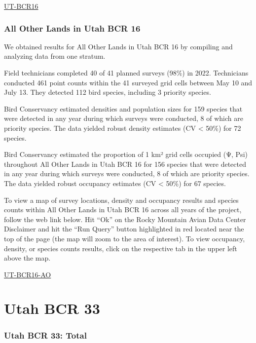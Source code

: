 \documentclass[
  letterpaper,
  DIV=11,
  numbers=noendperiod,
  oneside]{scrreprt}
\begin{document}
\href{http://www.rmbo.org/new_site/adc/QueryWindow.aspx\#N4IgzgrgDgpgTmALnAhoiBbEAuABCAVQBUBaAIQGEAlARgDYQBfIA===}{UT-BCR16}

\hypertarget{all-other-lands-in-utah-bcr-16}{%
\subsubsection{All Other Lands in Utah BCR
16}\label{all-other-lands-in-utah-bcr-16}}

We obtained results for All Other Lands in Utah BCR 16 by compiling and
analyzing data from one stratum.

Field technicians completed 40 of 41 planned surveys (98\%) in 2022.
Technicians conducted 461 point counts within the 41 surveyed grid cells
between May 10 and July 13. They detected 112 bird species, including 3
priority species.

Bird Conservancy estimated densities and population sizes for 159
species that were detected in any year during which surveys were
conducted, 8 of which are priority species. The data yielded robust
density estimates (CV \textless{} 50\%) for 72 species.

Bird Conservancy estimated the proportion of 1 km² grid cells occupied
(Ψ, Psi) throughout All Other Lands in Utah BCR 16 for 156 species that
were detected in any year during which surveys were conducted, 8 of
which are priority species. The data yielded robust occupancy estimates
(CV \textless{} 50\%) for 67 species.

To view a map of survey locations, density and occupancy results and
species counts within All Other Lands in Utah BCR 16 across all years of
the project, follow the web link below. Hit ``Ok'' on the Rocky Mountain
Avian Data Center Disclaimer and hit the ``Run Query'' button
highlighted in red located near the top of the page (the map will zoom
to the area of interest). To view occupancy, density, or species counts
results, click on the respective tab in the upper left above the map.

\href{http://www.rmbo.org/new_site/adc/QueryWindow.aspx\#N4IgzgLgTghhCuBbEAuABCAqgFQLQCEBhAJQEYA2XAQQHl0qAbBtGiACwFMo0AZGAOwAmYEAF8gA}{UT-BCR16-AO}

\hypertarget{utah-bcr-33}{%
\section{Utah BCR 33}\label{utah-bcr-33}}

\hypertarget{utah-bcr-33-total}{%
\subsubsection{Utah BCR 33: Total}\label{utah-bcr-33-total}}
\end{document}

